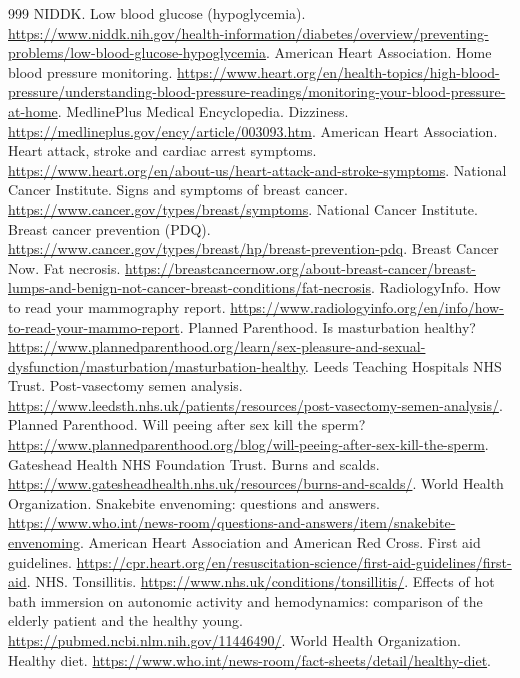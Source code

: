 \documentclass[11pt,oneside]{book}
\begin{document}
\begin{thebibliography}{999}
NIDDK. Low blood glucose (hypoglycemia). \url{https://www.niddk.nih.gov/health-information/diabetes/overview/preventing-problems/low-blood-glucose-hypoglycemia}.
American Heart Association. Home blood pressure monitoring. \url{https://www.heart.org/en/health-topics/high-blood-pressure/understanding-blood-pressure-readings/monitoring-your-blood-pressure-at-home}.
MedlinePlus Medical Encyclopedia. Dizziness. \url{https://medlineplus.gov/ency/article/003093.htm}.
American Heart Association. Heart attack, stroke and cardiac arrest symptoms. \url{https://www.heart.org/en/about-us/heart-attack-and-stroke-symptoms}.
National Cancer Institute. Signs and symptoms of breast cancer. \url{https://www.cancer.gov/types/breast/symptoms}.
National Cancer Institute. Breast cancer prevention (PDQ). \url{https://www.cancer.gov/types/breast/hp/breast-prevention-pdq}.
Breast Cancer Now. Fat necrosis. \url{https://breastcancernow.org/about-breast-cancer/breast-lumps-and-benign-not-cancer-breast-conditions/fat-necrosis}.
RadiologyInfo. How to read your mammography report. \url{https://www.radiologyinfo.org/en/info/how-to-read-your-mammo-report}.
Planned Parenthood. Is masturbation healthy? \url{https://www.plannedparenthood.org/learn/sex-pleasure-and-sexual-dysfunction/masturbation/masturbation-healthy}.
Leeds Teaching Hospitals NHS Trust. Post-vasectomy semen analysis. \url{https://www.leedsth.nhs.uk/patients/resources/post-vasectomy-semen-analysis/}.
Planned Parenthood. Will peeing after sex kill the sperm? \url{https://www.plannedparenthood.org/blog/will-peeing-after-sex-kill-the-sperm}.
Gateshead Health NHS Foundation Trust. Burns and scalds. \url{https://www.gatesheadhealth.nhs.uk/resources/burns-and-scalds/}.
World Health Organization. Snakebite envenoming: questions and answers. \url{https://www.who.int/news-room/questions-and-answers/item/snakebite-envenoming}.
American Heart Association and American Red Cross. First aid guidelines. \url{https://cpr.heart.org/en/resuscitation-science/first-aid-guidelines/first-aid}.
NHS. Tonsillitis. \url{https://www.nhs.uk/conditions/tonsillitis/}.
Effects of hot bath immersion on autonomic activity and hemodynamics: comparison of the elderly patient and the healthy young. \url{https://pubmed.ncbi.nlm.nih.gov/11446490/}.
World Health Organization. Healthy diet. \url{https://www.who.int/news-room/fact-sheets/detail/healthy-diet}.

\end{thebibliography}
\end{document}
